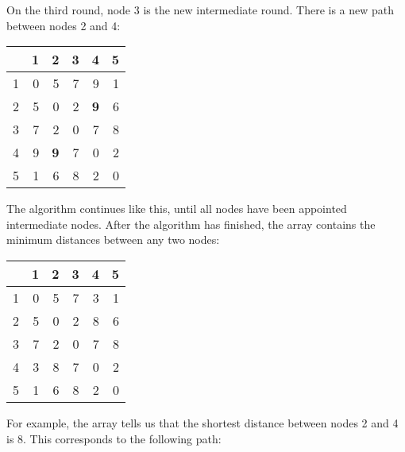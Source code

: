 On the third round, node 3 is the new intermediate round.
There is a new path between nodes 2 and 4:

\begin{center}
\begin{tabular}{r|rrrrr}
 & 1 & 2 & 3 & 4 & 5 \\
\hline
1 & 0 & 5 & 7 & 9 & 1 \\
2 & 5 & 0 & 2 & \textbf{9} & 6 \\
3 & 7 & 2 & 0 & 7 & 8 \\
4 & 9 & \textbf{9} & 7 & 0 & 2 \\
5 & 1 & 6 & 8 & 2 & 0 \\
\end{tabular}
\end{center}
\vspace{10pt}

The algorithm continues like this,
until all nodes have been appointed intermediate nodes.
After the algorithm has finished, the array contains
the minimum distances between any two nodes:

\begin{center}
\begin{tabular}{r|rrrrr}
 & 1 & 2 & 3 & 4 & 5 \\
\hline
1 & 0 & 5 & 7 & 3 & 1 \\
2 & 5 & 0 & 2 & 8 & 6 \\
3 & 7 & 2 & 0 & 7 & 8 \\
4 & 3 & 8 & 7 & 0 & 2 \\
5 & 1 & 6 & 8 & 2 & 0 \\
\end{tabular}
\end{center}

For example, the array tells us that the
shortest distance between nodes 2 and 4 is 8.
This corresponds to the following path:

\begin{center}
\end{center}

